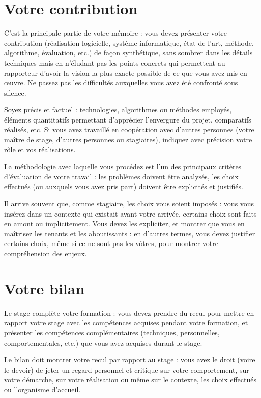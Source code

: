 \documentclass [twoside,openright,a4paper,11pt,french] {report}
\begin{document}
\section {Votre contribution}

C'est la principale partie de votre mémoire : vous devez présenter votre
contribution (réalisation logicielle, système informatique, état de
l'art, méthode, algorithme, évaluation, etc.) de façon synthétique,
sans sombrer dans les détails techniques mais en n'éludant pas les
points concrets qui permettent au rapporteur d'avoir la vision la plus
exacte possible de ce que vous avez mis en œuvre. Ne passez pas
les difficultés auxquelles vous avez été confronté sous silence.

Soyez précis et factuel : technologies, algorithmes ou méthodes
employés, éléments quantitatifs permettant d'apprécier l'envergure
du projet, comparatifs réalisés, etc. Si vous avez travaillé en
coopération avec d'autres personnes (votre maître de stage, d'autres
personnes ou stagiaires), indiquez avec précision votre rôle et vos
réalisations.

La méthodologie avec laquelle vous procédez est l'un des principaux
critères d'évaluation de votre travail : les problèmes doivent
être analysés, les choix effectués (ou auxquels vous avez pris part)
doivent être explicités et justifiés.

Il arrive souvent que, comme stagiaire, les choix vous soient imposés :
vous vous insérez dans un contexte qui existait avant votre arrivée,
certains choix sont faits en amont ou implicitement. Vous devez
les expliciter, et montrer que vous en maîtrisez les tenants et les
aboutissants : en d'autres termes, vous devez justifier certains choix,
même si ce ne sont pas les vôtres, pour montrer votre compréhension
des enjeux.

\section {Votre bilan}

Le stage complète votre formation : vous devez prendre du recul pour
mettre en rapport votre stage avec les compétences acquises pendant votre
formation, et présenter les compétences complémentaires (techniques,
personnelles, comportementales, etc.) que vous avez acquises durant
le stage.

Le bilan doit montrer votre recul par rapport au stage : vous avez le
droit (voire le devoir) de jeter un regard personnel et critique sur
votre comportement, sur votre démarche, sur votre réalisation ou même
sur le contexte, les choix effectués ou l'organisme d'accueil.
\end{document}

